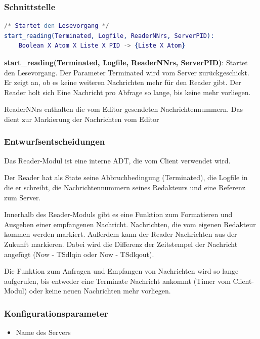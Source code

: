 \documentclass{article}
\begin{document}
\subsubsection{Schnittstelle}
\begin{lstlisting}[language=Erlang]
/* Startet den Lesevorgang */
start_reading(Terminated, Logfile, ReaderNNrs, ServerPID):
    Boolean X Atom X Liste X PID -> {Liste X Atom}
\end{lstlisting}

\textbf{start\_reading(Terminated, Logfile, ReaderNNrs, ServerPID)}: Startet den Lesevorgang. Der Parameter Terminated
wird vom Server zurückgeschickt. Er zeigt an, ob es keine weiteren Nachrichten mehr für den Reader gibt. Der Reader holt
sich Eine Nachricht pro Abfrage so lange, bis keine mehr vorliegen.

ReaderNNrs enthalten die vom Editor gesendeten Nachrichtennummern. Das dient zur Markierung der Nachrichten vom Editor\\

\subsubsection{Entwurfsentscheidungen}
Das Reader-Modul ist eine interne ADT, die vom Client verwendet wird.

Der Reader hat als State seine Abbruchbedingung (Terminated), die Logfile in die er schreibt, die Nachrichtennummern
seines Redakteurs und eine Referenz zum Server.

Innerhalb des Reader-Moduls gibt es eine Funktion zum Formatieren und Ausgeben einer empfangenen Nachricht.
Nachrichten, die vom eigenen Redakteur kommen werden markiert. Außerdem kann der Reader Nachrichten aus der Zukunft
markieren. Dabei wird die Differenz der Zeitstempel der Nachricht angefügt (Now - TSdlqin oder Now - TSdlqout).

Die Funktion zum Anfragen und Empfangen von Nachrichten wird so lange aufgerufen, bis entweder eine Terminate Nachricht
ankommt (Timer vom Client-Modul) oder keine neuen Nachrichten mehr vorliegen.

\subsubsection{Konfigurationsparameter}
\begin{itemize}
    \item Name des Servers
\end{itemize}
\end{document}

